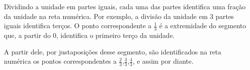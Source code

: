 Dividindo a unidade em partes iguais,  cada uma das partes identifica uma fração da unidade na reta numérica.
Por exemplo, a divisão da unidade em 3 partes iguais identifica terços. O ponto correspondente a $\frac{1}{3}$  é a extremidade do segmento que, a partir do 0, identifica o primeiro terço da unidade. 

\begin{center}
\end{center}


A partir dele, por justaposições desse segmento, são identificados na reta numérica os pontos correspondentes a $\frac{2}{3}$,$\frac{3}{3}$,$\frac{4}{3}$, e assim por diante. 




